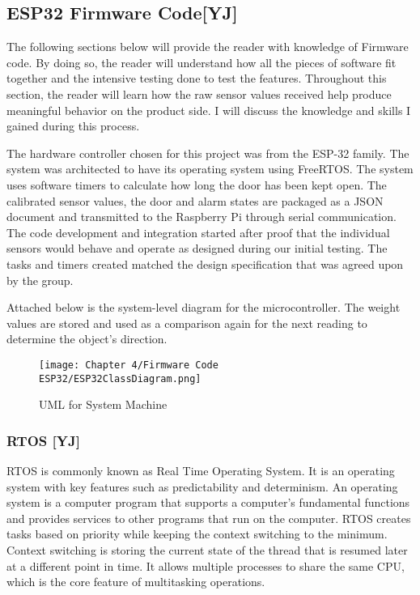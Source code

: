 \subsection{ESP32 Firmware Code[YJ]}

The following sections below will provide the reader with knowledge of Firmware code.
By doing so, the reader will understand how all the pieces of software fit together and the intensive testing done to test the features.
Throughout this section, the reader will learn how the raw sensor values received help produce meaningful behavior on the product side.
I will discuss the knowledge and skills I gained during this process.

The hardware controller chosen for this project was from the ESP-32 family.
The system was architected to have its operating system using FreeRTOS.
The system uses software timers to calculate how long the door has been kept open.
The calibrated sensor values, the door and alarm states are packaged as a JSON document and transmitted to the Raspberry Pi through serial communication.
The code development and integration started after proof that the individual sensors would behave and operate as designed during our initial testing.
The tasks and timers created matched the design specification that was agreed upon by the group.

Attached below is the system-level diagram for the microcontroller.
The weight values are stored and used as a comparison again for the next reading to determine the object's direction.

\begin{figure}[H]        
    \centering
    \texttt{[image: Chapter 4/Firmware Code ESP32/ESP32ClassDiagram.png]}
    \caption{UML for System Machine}
\end{figure} 

\subsubsection{RTOS [YJ]}

RTOS is commonly known as Real Time Operating System.
It is an operating system with key features such as predictability and determinism.
An operating system is a computer program that supports a computer's fundamental functions and provides services to other programs that run on the computer.
RTOS creates tasks based on priority while keeping the context switching to the minimum.
Context switching is storing the current state of the thread that is resumed later at a different point in time.
It allows multiple processes to share the same CPU, which is the core feature of multitasking operations.
\cite{RTOS:1} \cite{RTOS:2}

